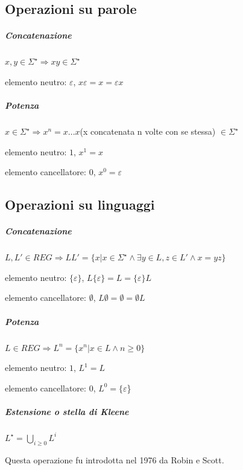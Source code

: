 \subsection{Operazioni su parole}
\subparagraph{Concatenazione} 
\begin{description}
	\item $x, y \in \Sigma^{\star} \Rightarrow xy \in \Sigma^{\star}$
	\item elemento neutro: $\varepsilon$, $x \varepsilon = x = \varepsilon x$
\end{description}
\subparagraph{Potenza}
\begin{description}
	\item $x \in \Sigma^{\star} \Rightarrow x^n = x. . .x $(x concatenata n volte con se stessa) $\in \Sigma^{\star}$
	\item elemento neutro: $1$, $x^1 = x$
	\item elemento cancellatore: $0$, $x^0 = \varepsilon$
\end{description}
\subsection{Operazioni su linguaggi}
\subparagraph{Concatenazione}
\begin{description}
	\item $L,L' \in REG \Rightarrow LL'=\{x | x \in \Sigma^{\star} \land \exists y \in L, z \in L' \land x=yz \}$
	\item elemento neutro: $\{\varepsilon\}$, $L \{\varepsilon\} = L =  \{\varepsilon\} L$
	\item elemento cancellatore: $\emptyset$, $L \emptyset = \emptyset =  \emptyset L$
\end{description}
\subparagraph{Potenza}
\begin{description}
	\item $L \in REG \Rightarrow L^n = \{ x^n | x \in L \land n \geq 0 \}$
	\item elemento neutro: $1$, $L^1 = L$
	\item elemento cancellatore: $0$, $L^0 = \{\varepsilon$\}
\end{description}
\subparagraph{Estensione o stella di Kleene}
\begin{description}
	\item $L^{\star} = \bigcup_{i \geq 0} L^i$
	\item Questa operazione fu introdotta nel 1976 da Robin e Scott.
\end{description}

